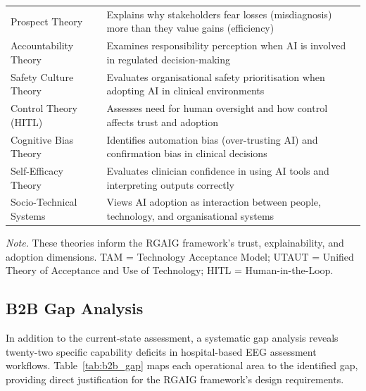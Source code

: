 {\begin{xltabular}{\textwidth}{@{} >{\raggedright\arraybackslash}p{3.2cm} L @{}}
\addlinespace
Prospect Theory & Explains why stakeholders fear losses (misdiagnosis) more than they value gains (efficiency) \\
\addlinespace
Accountability Theory & Examines responsibility perception when AI is involved in regulated decision-making \\
\addlinespace
Safety Culture Theory & Evaluates organisational safety prioritisation when adopting AI in clinical environments \\
\addlinespace
Control Theory (HITL) & Assesses need for human oversight and how control affects trust and adoption \\
\addlinespace
Cognitive Bias Theory & Identifies automation bias (over-trusting AI) and confirmation bias in clinical decisions \\
\addlinespace
Self-Efficacy Theory & Evaluates clinician confidence in using AI tools and interpreting outputs correctly \\
\addlinespace
Socio-Technical Systems & Views AI adoption as interaction between people, technology, and organisational systems \\
\end{xltabular}}
\vspace{0.5em}
\noindent\textit{Note.} These theories inform the RGAIG framework's trust, explainability, and adoption dimensions. TAM = Technology Acceptance Model; UTAUT = Unified Theory of Acceptance and Use of Technology; HITL = Human-in-the-Loop.
\fi %

\label{sec:b2b_psychological}
\label{tab:b2b_psychological}


\iffalse
\subsection{B2B Gap Analysis}
\label{sec:b2b_gap}

In addition to the current-state assessment, a systematic gap analysis reveals twenty-two specific capability deficits in hospital-based EEG assessment workflows. Table~\ref{tab:b2b_gap} maps each operational area to the identified gap, providing direct justification for the RGAIG framework's design requirements.


